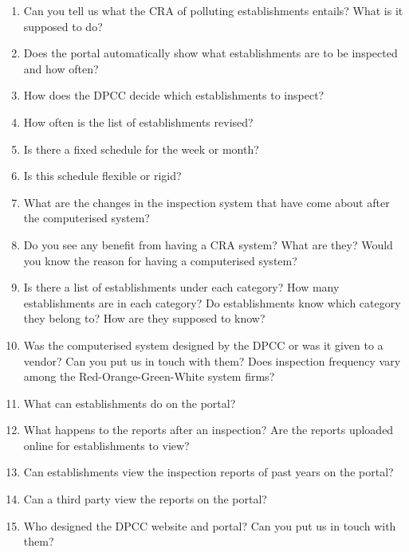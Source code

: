 \documentclass[a4paper, 12pt]{article}
\begin{document}
\begin{mdframed}[backgroundcolor=gray!20]
\begin{enumerate}
		\item{Can you tell us what the CRA of polluting establishments entails? What is it supposed to do?}
		\item{Does the portal automatically show what establishments are to be inspected and how often?}
		\item{How does the DPCC decide which establishments to inspect?}
		\item{How often is the list of establishments revised?}
		\item{Is there a fixed schedule for the week or month?}
		\item{Is this schedule flexible or rigid?}
		\item{What are the changes in the inspection system that have come about after the computerised system?}
		\item{Do you see any benefit from having a CRA system? What are they? Would you know the reason for having a computerised system?}
		\item{Is there a list of establishments under each category? How many establishments are in each category? Do establishments know which category they belong to? How are they supposed to know?}
		\item{Was the computerised system designed by the DPCC or was it given to a vendor? Can you put us in touch with them? Does inspection frequency vary among the Red-Orange-Green-White system firms?}
		\item{What can establishments do on the portal?}
		\item{What happens to the reports after an inspection? Are the reports uploaded online for establishments to view?}
		\item{Can establishments view the inspection reports of past years on the portal?}
		\item{Can a third party view the reports on the portal?}
		\item{Who designed the DPCC website and portal? Can you put us in touch with them?}
		\end{enumerate}
		\end{mdframed}
\end{document}
